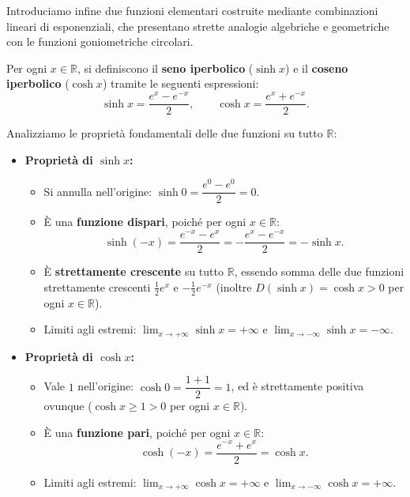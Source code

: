 Introduciamo infine due funzioni elementari costruite mediante combinazioni lineari di esponenziali, che presentano strette analogie algebriche e geometriche con le funzioni goniometriche circolari.

\begin{defbox}
Per ogni $x \in \mathbb{R}$, si definiscono il \textbf{seno iperbolico} ($\sinh x$) e il \textbf{coseno iperbolico} ($\cosh x$) tramite le seguenti espressioni:
\[
    \sinh x = \frac{e^x - e^{-x}}{2}, \qquad \cosh x = \frac{e^x + e^{-x}}{2}.
\]
\end{defbox}

Analizziamo le proprietà fondamentali delle due funzioni su tutto $\mathbb{R}$:
\begin{itemize}
    \item \textbf{Proprietà di $\sinh x$:}
    \begin{itemize}
        \item Si annulla nell'origine: $\sinh 0 = \dfrac{e^0 - e^0}{2} = 0$.
        \item È una \textbf{funzione dispari}, poiché per ogni $x \in \mathbb{R}$:
        \[
            \sinh(-x) = \frac{e^{-x} - e^x}{2} = -\frac{e^x - e^{-x}}{2} = -\sinh x.
        \]
        \item È \textbf{strettamente crescente} su tutto $\mathbb{R}$, essendo somma delle due funzioni strettamente crescenti $\frac{1}{2}e^x$ e $-\frac{1}{2}e^{-x}$ (inoltre $D(\sinh x) = \cosh x > 0$ per ogni $x \in \mathbb{R}$).
        \item Limiti agli estremi: $\lim_{x \to +\infty} \sinh x = +\infty$ e $\lim_{x \to -\infty} \sinh x = -\infty$.
    \end{itemize}

    \item \textbf{Proprietà di $\cosh x$:}
    \begin{itemize}
        \item Vale $1$ nell'origine: $\cosh 0 = \dfrac{1 + 1}{2} = 1$, ed è strettamente positiva ovunque ($\cosh x \ge 1 > 0$ per ogni $x \in \mathbb{R}$).
        \item È una \textbf{funzione pari}, poiché per ogni $x \in \mathbb{R}$:
        \[
            \cosh(-x) = \frac{e^{-x} + e^x}{2} = \cosh x.
        \]
        \item Limiti agli estremi: $\lim_{x \to +\infty} \cosh x = +\infty$ e $\lim_{x \to -\infty} \cosh x = +\infty$.
    \end{itemize}
\end{itemize}

